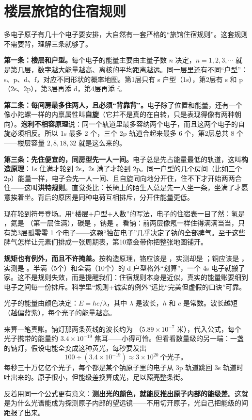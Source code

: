\section{楼层旅馆的住宿规则}

多电子原子有几十个电子要安排，大自然有一套严格的“旅馆住宿规则”。这套规则不需要背，理解三条就够了。

\textbf{第一条：楼层和户型。}每个电子的能量主要由主量子数 $n$ 决定，$n=1,2,3,\cdots$ 就是第几层，数字越大能量越高、离核的平均距离越远。同一层里还有不同“户型”：s、p、d、f，对应不同形状的概率地图。第1层只有 s 户型（1s），第2层有 s 和 p（2s、2p），第3层再添 d，第4层再添 f。

\textbf{第二条：每间房最多住两人，且必须“背靠背”。}电子除了位置和能量，还有一个像小陀螺一样的内禀属性叫\textbf{自旋}（它并不是真的在自转，只是表现得像有两种朝向）。\textbf{泡利不相容原理}说：同一个轨道里最多容纳两个电子，而且这两个电子的自旋必须相反。所以 1s 最多 2 个，三个 2p 轨道合起来最多 6 个，第2层总共 8 个——楼层容量 $2,8,18,32$ 就是这么来的。

\textbf{第三条：先住便宜的，同房型先一人一间。}电子总是先占能量最低的轨道，这叫\textbf{构造原理}：1s 住满才轮到 2s，2s 满了才轮到 2p。同一户型的几个房间（比如三个 2p）能量一样，电子会先一人一间、且自旋同向地分开住，住不下才开始两两合住——这叫\textbf{洪特规则}。直觉类比：长椅上的陌生人总是先一人坐一条，坐满了才愿意挨着坐。背后的原因是同种电荷互相排斥，分开住能量更低。

现在轮到符号登场。用“楼层+户型+人数”的写法，电子的住宿表一目了然：氢是 ，氦是 （第一层住满），碳是 ，钠是 。看钠：前两层像氖一样住得满满当当，只有第3层孤零零 1 个电子——这颗“独苗电子”几乎决定了钠的全部脾气。至于这些脾气怎样让元素们排成一张周期表，第10章会带你把整张地图铺开。

\textbf{规矩也有例外，而且不许掩盖。}按构造原理，铬应该是 ，实测却是 ；铜应该是 ，实测是 。半满（5个）和全满（10个）的 d 户型格外“划算”，一个 4s 电子就搬了家。这不是规则失效，而是提醒我们：住宿规则本身是近似，真实的能量账要细到电子之间每一份排斥。科学里“规则+诚实的例外”远比“完美但虚假的口诀”可靠。

\begin{qiaoliang}
光子的能量由颜色决定：$E = hc/\lambda$，其中 $\lambda$ 是波长，$h$ 和 $c$ 是常数。波长越短（越偏蓝紫），每个光子的能量越高。

来算一笔真账。钠灯那两条黄线的波长约为 （$5.89\times10^{-7}$ 米），代入公式，每个光子携带的能量约 $3.4\times10^{-19}$ 焦耳——小得可怜。但看看数量级的另一端：一盏  的钠灯，假设电能全变成这种黄光，每秒要发出
\[100 \div (3.4\times10^{-19}) \approx 3\times10^{20}\ \text{个光子}。\]
每秒三十万亿亿个光子，每个都是某个钠原子里的电子从 3p 轨道跳回 3s 轨道时吐出来的。原子很小，但能级差换算成光，足以照亮整条街。

反着用同一个公式更有意义：\textbf{测出光的颜色，就能反推出原子内部的能级差}。这就是为什么光谱能成为探测原子内部的望远镜——不用切开原子，光自己把能级的间距报了出来。
\end{qiaoliang}

